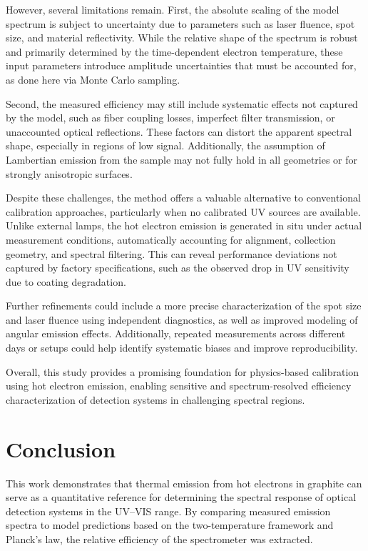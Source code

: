 \documentclass[
	parskip=half,
	a4paper,
]{scrarticle}
\begin{document}
However, several limitations remain. First, the absolute scaling of the model spectrum is subject to uncertainty due to parameters such as laser fluence, spot size, and material reflectivity. While the relative shape of the spectrum is robust and primarily determined by the time-dependent electron temperature, these input parameters introduce amplitude uncertainties that must be accounted for, as done here via Monte Carlo sampling.

Second, the measured efficiency may still include systematic effects not captured by the model, such as fiber coupling losses, imperfect filter transmission, or unaccounted optical reflections. These factors can distort the apparent spectral shape, especially in regions of low signal. Additionally, the assumption of Lambertian emission from the sample may not fully hold in all geometries or for strongly anisotropic surfaces.

Despite these challenges, the method offers a valuable alternative to conventional calibration approaches, particularly when no calibrated UV sources are available. Unlike external lamps, the hot electron emission is generated in situ under actual measurement conditions, automatically accounting for alignment, collection geometry, and spectral filtering. This can reveal performance deviations not captured by factory specifications, such as the observed drop in UV sensitivity due to coating degradation.

Further refinements could include a more precise characterization of the spot size and laser fluence using independent diagnostics, as well as improved modeling of angular emission effects. Additionally, repeated measurements across different days or setups could help identify systematic biases and improve reproducibility.

Overall, this study provides a promising foundation for physics-based calibration using hot electron emission, enabling sensitive and spectrum-resolved efficiency characterization of detection systems in challenging spectral regions.


\section{Conclusion}

This work demonstrates that thermal emission from hot electrons in graphite can serve as a quantitative reference for determining the spectral response of optical detection systems in the UV–VIS range. By comparing measured emission spectra to model predictions based on the two-temperature framework and Planck's law, the relative efficiency of the spectrometer was extracted.
\end{document}

